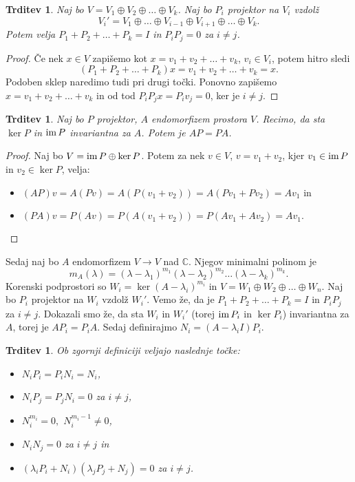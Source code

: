 \documentclass[10pt, a4paper]{article}
\newtheorem{trditev}[izr]{Trditev}
\newenvironment{noticeC}{%
  \tcolorbox[%
  notitle,
  empty,
  enhanced,  %
  breakable,
  coltext=black, 
  fontupper=\rmfamily,
  parbox=false,
  noparskip,
  sharp corners,
  boxrule=-1pt,  %
  frame hidden,
  left=7pt,  %
  right=7pt,
  top=5pt,
  bottom=5pt,
  before skip=2.5ex plus 2pt,
  after skip=2.5ex plus 2pt,
  overlay unbroken and last={%
  },
  ]}
{\endtcolorbox}
\newenvironment{dokaz}%
  {\begin{noticeC}\begin{proof}}%
  {\end{proof}\end{noticeC}}
\newcommand{\C}{\mathbb {C}}
\newcommand{\im}{\textup{\text{im}}\,}
\begin{document}
\begin{trditev}
    Naj bo $V = V_1 \oplus V_2 \oplus \dots \oplus V_k$.
    Naj bo $P_i$ projektor na $V_i$ vzdolž $$V_i' = V_1 \oplus \dots \oplus V_{i-1} \oplus V_{i+1} \oplus \dots \oplus V_k.$$
    Potem velja $P_1 + P_2 + \dots + P_k = I$ in $P_i P_j = 0$ za $i \neq j$.
\end{trditev}

\begin{dokaz}
    Če nek $x \in V$ zapišemo kot $x = v_1 + v_2 + \dots + v_k$, $v_i \in V_i$,
    potem hitro sledi $$(P_1 + P_2 + \dots + P_k)x = v_1 + v_2 + \dots + v_k = x.$$
    Podoben sklep naredimo tudi pri drugi točki. 
    Ponovno zapišemo $x =v_1 + v_2 + \dots + v_k$ in od tod $P_i P_j x = P_i v_j = 0$, ker je $i \neq j.$
\end{dokaz}

\begin{trditev}
    Naj bo $P$ projektor, $A$ endomorfizem prostora $V$.
    Recimo, da sta $\ker P$ in $\im P$ invariantna za $A$.
    Potem je $AP = PA$.
\end{trditev}

\begin{dokaz}
    Naj bo $V = \im P \oplus \ker P$.
    Potem za nek $v \in V$, $v = v_1 + v_2$, kjer $v_1 \in \im P$ in $v_2 \in \ker P$,
    velja:
    \begin{itemize}
        \item $(AP)v = A(Pv) = A(P(v_1 + v_2)) = A(Pv_1 + Pv_2) = Av_1$ in 
        \item $(PA)v = P(Av) = P(A(v_1 + v_2)) = P(Av_1 + Av_2) = Av_1.$ \qedhere
    \end{itemize}
\end{dokaz}

Sedaj naj bo $A$ endomorfizem $V \rightarrow V$ nad $\C$.
Njegov minimalni polinom je $$m_A (\lambda) = (\lambda - \lambda_1)^{m_1} (\lambda - \lambda_2)^{m_2} \dots (\lambda - \lambda_k)^{m_k}.$$
Korenski podprostori so $W_i = \ker (A - \lambda_i)^{m_i}$ in $V = W_1 \oplus W_2 \oplus \dots \oplus W_n.$
Naj bo $P_i$ projektor na $W_i$ vzdolž $W_i'$.
Vemo že, da je $P_1 + P_2 + \dots + P_k = I$ in $P_i P_j$ za $i \neq j$.
Dokazali smo že, da sta $W_i$ in $W_i'$ (torej $\im P_i$ in $\ker P_i$) invariantna za $A$, torej je $AP_i = P_i A$.
Sedaj definirajmo $N_i = (A - \lambda_i I)P_i.$

\begin{trditev}
    Ob zgornji definiciji veljajo naslednje točke:
    \begin{itemize}
        \item $N_i P_i = P_i N_i = N_i$,
        \item $N_i P_j = P_j N_i = 0$ za $i \neq j$,
        \item $N_i ^{m_i} = 0,$ $N_i ^{m_i - 1} \neq 0$,
        \item $N_i N_j = 0$ za $i \neq j$ in 
        \item $(\lambda_i P_i + N_i) (\lambda_j P_j + N_j) = 0$ za $i \neq j$.
    \end{itemize}
\end{trditev}
\end{document}
